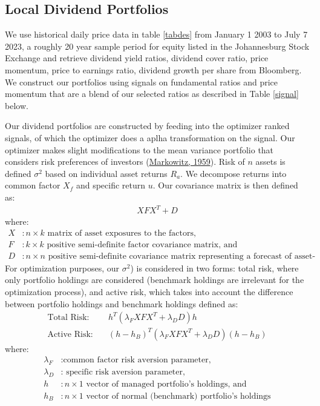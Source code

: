 \documentclass[11pt,preprint, authoryear]{elsarticle}
\numberwithin{equation}{section}
\numberwithin{figure}{section}
\numberwithin{table}{section}
\begin{document}
\hypertarget{local-dividend-portfolios}{%
\subsection{Local Dividend Portfolios}\label{local-dividend-portfolios}}

We use historical daily price data in table \ref{tabdes} from January 1
2003 to July 7 2023, a roughly 20 year sample period for equity listed
in the Johannesburg Stock Exchange and retrieve dividend yield ratios,
dividend cover ratio, price momentum, price to earnings ratio, dividend
growth per share from Bloomberg. We construct our portfolios using
signals on fundamental ratios and price momentum that are a blend of our
selected ratios as described in Table \ref{signal} below.

Our dividend portfolios are constructed by feeding into the optimizer
ranked signals, of which the optimizer does a aplha transformation on
the signal. Our optimizer makes slight modifications to the mean
variance portfolio that considers risk preferences of investors
(\protect\hyperlink{ref-markowitz1959portfolio}{Markowitz, 1959}). Risk
of \(n\) assets is defined \(\sigma^2\) based on individual asset
returns \(R_a\). We decompose returns into common factor \(X_f\) and
specific return \(u\). Our covariance matrix is then defined as: \[
\begin{aligned}
XFX^T + D
\end{aligned}
\] where: \begin{align*}
X & : n \times k \text{ matrix of asset exposures to the factors,} \\ F & : k \times k \text{ positive semi-definite factor covariance matrix, and} \\ D & : n \times n \text{ positive semi-definite covariance matrix representing a forecast of asset-specific risk.}
\end{align*} For optimization purposes, our \(\sigma^2\)) is considered
in two forms: total risk, where only portfolio holdings are considered
(benchmark holdings are irrelevant for the optimization process), and
active risk, which takes into account the difference between portfolio
holdings and benchmark holdings defined as: \begin{align*}
\text{Total Risk:} & \quad h^T(\lambda_F X F X^T + \lambda_D D) h \\
\text{Active Risk:} & \quad (h - h_B)^T(\lambda_F X F X^T + \lambda_D D)(h - h_B)
\end{align*} where: \begin{align*}
\lambda_F & : \text{common factor risk aversion parameter,} \\
\lambda_D & : \text{ specific risk aversion parameter,} \\
h & : n \times 1 \text{ vector of managed portfolio's holdings, and} \\
h_B & : n \times 1 \text{ vector of normal (benchmark) portfolio's holdings}
\end{align*}
\end{document}
